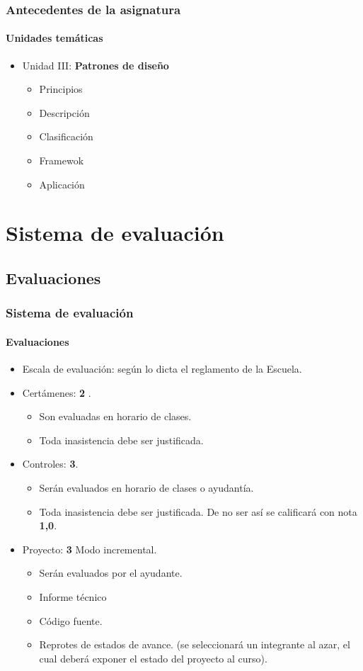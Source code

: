 \documentclass{beamer}
\begin{document}
		\begin{frame}
			\frametitle{Antecedentes de la asignatura}
			\framesubtitle{Unidades tem\'aticas}

			\begin{itemize}
				\item Unidad III: \textbf{Patrones de dise\~no}
				\begin{itemize}
					\item Principios
					\item Descripci\'on
					\item Clasificaci\'on
					\item Framewok
					\item Aplicaci\'on
				\end{itemize}
			\end{itemize}
		\end{frame}

	\section{Sistema de evaluaci\'on}

		\subsection{Evaluaciones}

		\begin{frame}
			\frametitle{Sistema de evaluaci\'on}
			\framesubtitle{Evaluaciones}

			\begin{itemize}
				\item Escala de evaluaci\'on: seg\'un lo dicta el reglamento de la Escuela.
				\item Cert\'amenes: \textbf{2} .
				\begin{itemize}
					\item Son evaluadas en horario de clases.
					\item Toda inasistencia debe ser justificada.
				\end{itemize}
				\item Controles: \textbf{3}.
				\begin{itemize}
					\item Ser\'an evaluados en horario de clases o ayudant\'ia.
					\item Toda inasistencia debe ser justificada. De no ser as\'i se calificar\'a con nota \textbf{1,0}.
				\end{itemize}
				\item Proyecto: \textbf{3} Modo incremental.
				\begin{itemize}
				    \item Ser\'an evaluados por el ayudante.
					\item Informe t\'ecnico
					\item C\'odigo fuente.
					\item Reprotes de estados de avance. (se seleccionar\'a un integrante al azar, el cual deberá exponer el estado del proyecto al curso).
				\end{itemize}
			\end{itemize}
		\end{frame}
\end{document}
